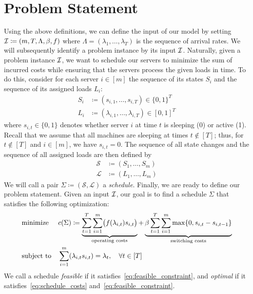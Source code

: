 \section{Problem Statement}
Using the above definitions, we can define the input of our model by setting $\mathcal{I}\coloneqq(m,T,\Lambda,\beta,f)$ where $\Lambda=(\lambda_1,\dotsc,\lambda_T)$ is the sequence of arrival rates. We will subsequently identify a problem instance by its input $\mathcal{I}$. Naturally, given a problem instance $\mathcal{I}$, we want to schedule our servers to minimize the sum of incurred costs while ensuring that the servers process the given loads in time. To do this, consider for each server $i\in[m]$ the sequence of its states $S_i$ and the sequence of its assigned loads $L_i$:
\begin{align*}
	S_i&\coloneqq(s_{i,1},\dotsc,s_{i,T})\in\{0,1\}^T\\
	L_i&\coloneqq(\lambda_{i,1},\dotsc,\lambda_{i,T})\in[0,1]^T
\end{align*}
where $s_{i,t}\in\{0,1\}$ denotes whether server $i$ at time $t$ is sleeping (0) or active (1). Recall that we assume that all machines are sleeping at times $t\notin[T]$; thus, for $t\notin[T]$ and $i\in[m]$, we have $s_{i,t}=0$. The sequence of all state changes and the sequence of all assigned loads are then defined by
\begin{align*}
	\mathcal{S}&\coloneqq(S_1,\dotsc,S_m)\\
	\mathcal{L}&\coloneqq(L_1,\dotsc,L_m)
\end{align*}
We will call a pair $\Sigma\coloneqq(\mathcal{S},\mathcal{L})$ a \emph{schedule}. Finally, we are ready to define our problem statement. Given an input $\mathcal{I}$, our goal is to find a schedule $\Sigma$ that satisfies the following optimization:
\begin{align}
	&\text{minimize}&&c(\Sigma)\coloneqq\underbrace{\sum\limits_{t=1}^{T}\sum\limits_{i=1}^{m}\bigl(f(\lambda_{i,t}) s_{i,t}\bigr)}_{\text{operating costs}}+\underbrace{\beta\sum\limits_{t=1}^{T}\sum\limits_{i=1}^{m}\max\{0,s_{i,t}-s_{i,t-1}\}}_{\text{switching costs}}\label{eq:schedule_costs}\\ 
	&\text{subject to}&&\sum\limits_{i=1}^{m}(\lambda_{i,t} s_{i,t})=\lambda_t,\quad \forall t\in[T]\label{eq:feasible_constraint}
\end{align}
We call a schedule \emph{feasible} if it satisfies~\eqref{eq:feasible_constraint}, and \emph{optimal} if it satisfies~\eqref{eq:schedule_costs} and~\eqref{eq:feasible_constraint}.
